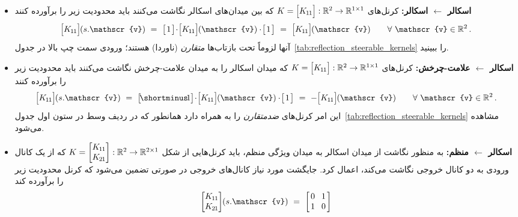 \begin{itemize}
	\setlength{\itemindent}{-2em}
	\setlength{\itemsep}{.5em}
	\item[{\rule[2.0pt]{2pt}{2pt}}]
	\textbf{اسکالر $\leftarrow$ اسکالر:}
	کرنل‌های
	$K = \pig[\Koo\pig]: \R^2 \to \R^{1\times1}$
	که بین میدان‌های اسکالر نگاشت می‌کنند باید محدودیت زیر را برآورده کنند
	\begin{align}
		\pig[\Koo\pig] \mkern-1mu (s.\mathscr{v})
		\ =\ 
		\big[\mkern2mu 1 \mkern2mu\big]
		\!\cdot\!
		\pig[\Koo\pig] \mkern-1mu (\mathscr{v})
		\cdot\!
		\big[\mkern2mu 1 \mkern2mu\big]
		\ =\ 
		\pig[\Koo\pig] \mkern-1mu (\mathscr{v})
		\qquad \forall\ \mathscr{v} \in \R^2 \,.
	\end{align}
	آنها لزوماً تحت بازتاب‌ها \emph{متقارن} (ناوردا) هستند؛ ورودی سمت چپ بالا در جدول~\ref{tab:reflection_steerable_kernels} را ببینید.
	\item[{\rule[2.0pt]{2pt}{2pt}}]
	\textbf{اسکالر $\leftarrow$ علامت-چرخش:}
	کرنل‌های $K = \pig[\Koo\pig]: \R^2 \to \R^{1\times1}$ که میدان اسکالر را به میدان علامت-چرخش نگاشت می‌کنند باید محدودیت زیر را برآورده کنند
	\begin{align}
		\pig[\Koo\pig] \mkern-1mu (s.\mathscr{v})
		\ =\ 
		\big[\! \shortminus\!1 \big]
		\!\cdot\!
		\pig[\Koo\pig] \mkern-1mu (\mathscr{v})
		\cdot\!
		\big[\mkern2mu 1 \mkern2mu\big]
		\ =\
		-\pig[\Koo\pig] \mkern-1mu (\mathscr{v})
		\qquad \forall\ \mathscr{v} \in \R^2 \,.
	\end{align}
	این امر کرنل‌های \emph{ضدمتقارن} را به همراه دارد همانطور که در ردیف وسط در ستون اول جدول~\ref{tab:reflection_steerable_kernels} مشاهده می‌شود.
	\item[{\rule[2.0pt]{2pt}{2pt}}]
	\textbf{اسکالر $\leftarrow$ منظم:}
	به منظور نگاشت از میدان اسکالر به میدان ویژگی منظم، باید کرنل‌هایی از شکل
	$K = \begin{bmatrix} K_{\mkern-1mu 1 \mkern-1mu 1} \\ K_{\mkern-1mu 2 \mkern-1mu 1} \end{bmatrix}: \mathbb{R}^2 \to \mathbb{R}^{2\times1}$
	که از یک کانال ورودی به دو کانال خروجی نگاشت می‌کند، اعمال کرد.
	جایگشت مورد نیاز کانال‌های خروجی در صورتی تضمین می‌شود که کرنل محدودیت زیر را برآورده کند
	\begin{align}\label{eq:constraint_s2r}
		\begin{bmatrix} \Koo \\ \Kto \end{bmatrix} \mkern-4mu (s.\mathscr{v})
		\ =\ 
		\begin{bmatrix} \hspace{1.5pt} 0 &\mkern-4mu 1 \hspace*{1.5pt} \\ \hspace{1.5pt} 1 &\mkern-4mu 0 \hspace*{1.5pt} \end{bmatrix}

\end{align}
\end{itemize}
